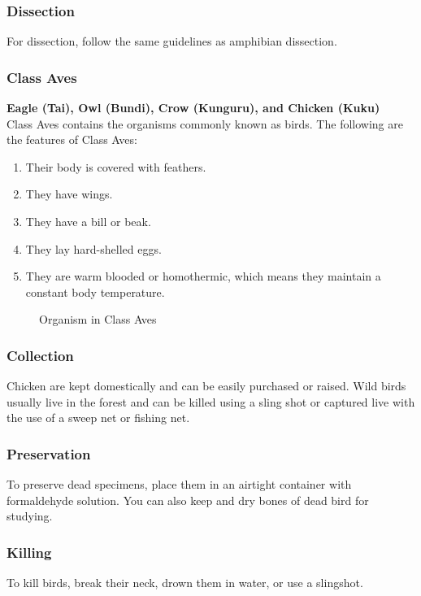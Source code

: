 \subsubsection{Dissection}
For dissection, follow the same guidelines as amphibian dissection.

\subsubsection{Class Aves}

\textbf{Eagle (Tai), Owl (Bundi), Crow (Kunguru), and Chicken (Kuku)}\\ Class Aves contains the organisms commonly known as birds. The following are the features of Class Aves:\\
\begin{enumerate}
\item{Their body is covered with feathers.}
\item{They have wings.}
\item{They have a bill or beak.}
\item{They lay hard-shelled eggs.}
\item{They are warm blooded or homothermic, which means they maintain a constant body temperature.}
\end{enumerate}

\begin{figure}
\begin{center}
\def\svgwidth{6cm}

\caption{Organism in Class Aves}
\label{fig:bird}
\end{center}
\end{figure}

\subsubsection{Collection}
Chicken are kept domestically and can be easily purchased or raised. Wild birds usually live in the forest and can be killed using a sling shot or captured live with the use of a sweep net or fishing net.

\subsubsection{Preservation} 
To preserve dead specimens, place them in an airtight container with formaldehyde solution. You can also keep and dry bones of dead bird for studying.

\subsubsection{Killing}
 To kill birds, break their neck, drown them in water, or use a slingshot.

